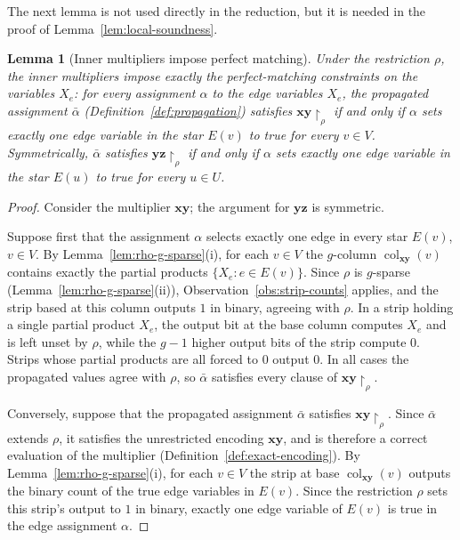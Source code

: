 \documentclass[11pt]{article}
\newtheorem{lemma}[theorem]{Lemma}
\theoremstyle{definition}
\theoremstyle{remark}
\newcommand{\col}{\operatorname{col}}
\newcommand{\vv}[1]{\mathbf{#1}}
\begin{document}
The next lemma is not used directly in the reduction, but it is needed in the proof of Lemma~\ref{lem:local-soundness}.

\begin{lemma}[Inner multipliers impose perfect matching]
\label{lem:inner-pm}
Under the restriction $\rho$, the inner multipliers impose exactly the perfect-matching constraints on the variables $X_e$: for every assignment $\alpha$ to the edge variables $X_e$,
the propagated assignment $\bar\alpha$ (Definition~\ref{def:propagation}) satisfies $\vv{x}\vv{y}\!\upharpoonright_{\rho}$ if and only if $\alpha$ sets
exactly one edge variable in the star $E(v)$ to true for every $v\in V$. Symmetrically, $\bar\alpha$ satisfies
$\vv{y}\vv{z}\!\upharpoonright_{\rho}$ if and only if $\alpha$ sets exactly one edge variable in the star $E(u)$ to true for every $u\in U$.
\end{lemma}

\begin{proof}
Consider the multiplier $\vv{x}\vv{y}$; the argument for $\vv{y}\vv{z}$ is symmetric.

Suppose first that the assignment $\alpha$ selects exactly one edge in every star $E(v)$, $v\in V$. By Lemma~\ref{lem:rho-g-sparse}(i), for each $v\in V$ the $g$-column $\col_{\vv{xy}}(v)$ contains exactly the partial products
$\{X_e : e\in E(v)\}$. Since $\rho$ is $g$-sparse (Lemma~\ref{lem:rho-g-sparse}(ii)), Observation~\ref{obs:strip-counts} applies, and the strip based at this column outputs $1$ in binary, agreeing with $\rho$. In a strip holding a single partial product $X_e$, the
output bit at the base column computes $X_e$ and is left unset by $\rho$, while the $g-1$ higher output bits of the strip compute $0$. Strips whose
partial products are all forced to $0$ output $0$. In all cases the propagated values agree with $\rho$, so $\bar\alpha$ satisfies every clause of $\vv{x}\vv{y}\!\upharpoonright_{\rho}$.

Conversely, suppose that the propagated assignment $\bar\alpha$ satisfies $\vv{x}\vv{y}\!\upharpoonright_{\rho}$. Since $\bar\alpha$ extends $\rho$, it satisfies the unrestricted encoding
$\vv{x}\vv{y}$, and is therefore a correct evaluation of the multiplier (Definition~\ref{def:exact-encoding}). By Lemma~\ref{lem:rho-g-sparse}(i), for each $v\in V$ the strip at base $\col_{\vv{xy}}(v)$ outputs the binary count of the true edge variables in $E(v)$. Since the restriction $\rho$ sets this strip's output to $1$ in binary, exactly one edge variable of
$E(v)$ is true in the edge assignment $\alpha$.
\end{proof}
\end{document}
